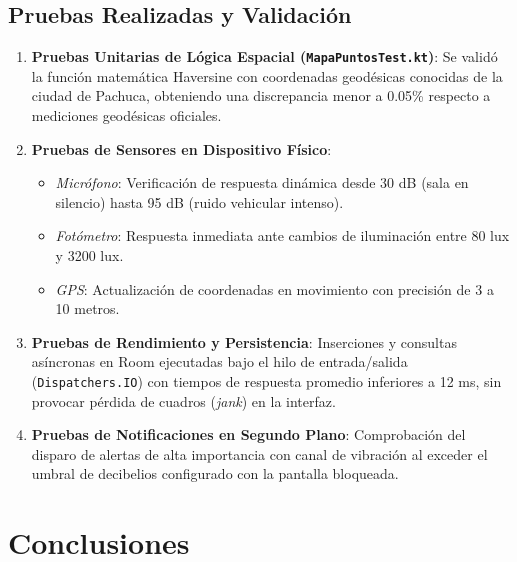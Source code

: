\documentclass[12pt,a4paper]{article}
\begin{document}
\subsection{Pruebas Realizadas y Validación}

\begin{enumerate}[label=\textbf{\arabic*.}]
    \item \textbf{Pruebas Unitarias de Lógica Espacial (\texttt{MapaPuntosTest.kt})}:
    Se validó la función matemática Haversine con coordenadas geodésicas conocidas de la ciudad de Pachuca, obteniendo una discrepancia menor a 0.05\% respecto a mediciones geodésicas oficiales.
    \item \textbf{Pruebas de Sensores en Dispositivo Físico}:
    \begin{itemize}
        \item \textit{Micrófono}: Verificación de respuesta dinámica desde 30 dB (sala en silencio) hasta 95 dB (ruido vehicular intenso).
        \item \textit{Fotómetro}: Respuesta inmediata ante cambios de iluminación entre 80 lux y 3200 lux.
        \item \textit{GPS}: Actualización de coordenadas en movimiento con precisión de 3 a 10 metros.
    \end{itemize}
    \item \textbf{Pruebas de Rendimiento y Persistencia}:
    Inserciones y consultas asíncronas en Room ejecutadas bajo el hilo de entrada/salida (\texttt{Dispatchers.IO}) con tiempos de respuesta promedio inferiores a 12 ms, sin provocar pérdida de cuadros (\textit{jank}) en la interfaz.
    \item \textbf{Pruebas de Notificaciones en Segundo Plano}:
    Comprobación del disparo de alertas de alta importancia con canal de vibración al exceder el umbral de decibelios configurado con la pantalla bloqueada.
\end{enumerate}

\section{Conclusiones}
\end{document}
